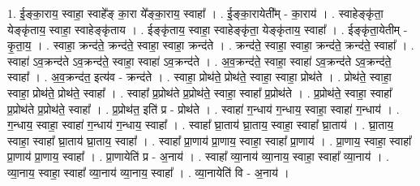 \documentclass[17pt]{extarticle}
\begin{document}
1. ई॒ङ्का॒राय॒ स्वाहा॒ स्वाहे᳚ङ् का॒रा ये᳚ङ्का॒राय॒ स्वाहा᳚ । . ई॒ङ्का॒रायेती᳚म् - का॒राय॑ । . स्वाहेङ्कृ॑ता॒ येङ्कृ॑ताय॒ स्वाहा॒ स्वाहेङ्कृ॑ताय । . ईङ्कृ॑ताय॒ स्वाहा॒ स्वाहेङ्कृ॑ता॒ येङ्कृ॑ताय॒ स्वाहा᳚ । . ईङ्कृ॑ता॒येतीम् - कृ॒ता॒य॒ । . स्वाहा॒ क्रन्द॑ते॒ क्रन्द॑ते॒ स्वाहा॒ स्वाहा॒ क्रन्द॑ते । . क्रन्द॑ते॒ स्वाहा॒ स्वाहा॒ क्रन्द॑ते॒ क्रन्द॑ते॒ स्वाहा᳚ । . स्वाहा॑ ऽव॒क्रन्द॑ते ऽव॒क्रन्द॑ते॒ स्वाहा॒ स्वाहा॑ ऽव॒क्रन्द॑ते । . अ॒व॒क्रन्द॑ते॒ स्वाहा॒ स्वाहा॑ ऽव॒क्रन्द॑ते ऽव॒क्रन्द॑ते॒ स्वाहा᳚ । . अ॒व॒क्रन्द॑त॒ इत्य॑व - क्रन्द॑ते । . स्वाहा॒ प्रोथ॑ते॒ प्रोथ॑ते॒ स्वाहा॒ स्वाहा॒ प्रोथ॑ते । . प्रोथ॑ते॒ स्वाहा॒ स्वाहा॒ प्रोथ॑ते॒ प्रोथ॑ते॒ स्वाहा᳚ । . स्वाहा᳚ प्र॒प्रोथ॑ते प्र॒प्रोथ॑ते॒ स्वाहा॒ स्वाहा᳚ प्र॒प्रोथ॑ते । . प्र॒प्रोथ॑ते॒ स्वाहा॒ स्वाहा᳚ प्र॒प्रोथ॑ते प्र॒प्रोथ॑ते॒ स्वाहा᳚ । . प्र॒प्रोथ॑त॒ इति॑ प्र - प्रोथ॑ते । . स्वाहा॑ ग॒न्धाय॑ ग॒न्धाय॒ स्वाहा॒ स्वाहा॑ ग॒न्धाय॑ । . ग॒न्धाय॒ स्वाहा॒ स्वाहा॑ ग॒न्धाय॑ ग॒न्धाय॒ स्वाहा᳚ । . स्वाहा᳚ घ्रा॒ताय॑ घ्रा॒ताय॒ स्वाहा॒ स्वाहा᳚ घ्रा॒ताय॑ । . घ्रा॒ताय॒ स्वाहा॒ स्वाहा᳚ घ्रा॒ताय॑ घ्रा॒ताय॒ स्वाहा᳚ । . स्वाहा᳚ प्रा॒णाय॑ प्रा॒णाय॒ स्वाहा॒ स्वाहा᳚ प्रा॒णाय॑ । . प्रा॒णाय॒ स्वाहा॒ स्वाहा᳚ प्रा॒णाय॑ प्रा॒णाय॒ स्वाहा᳚ । . प्रा॒णायेति॑ प्र - अ॒नाय॑ । . स्वाहा᳚ व्या॒नाय॑ व्या॒नाय॒ स्वाहा॒ स्वाहा᳚ व्या॒नाय॑ । . व्या॒नाय॒ स्वाहा॒ स्वाहा᳚ व्या॒नाय॑ व्या॒नाय॒ स्वाहा᳚ । . व्या॒नायेति॑ वि - अ॒नाय॑ । \newline
\end{document}
